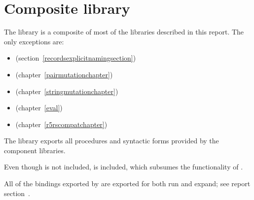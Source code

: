 \chapter{Composite library}
\label{complibchapter}

The  library is a composite of most of the libraries
described in this report.  The only exceptions are:
%
\begin{itemize}
\item {} (section~\ref{recordsexplicitnamingsection})
\item {} (chapter~\ref{pairmutationchapter})
\item {} (chapter~\ref{stringmutationchapter})
\item {} (chapter~\ref{eval})
\item {} (chapter~\ref{r5rscompatchapter})
\end{itemize}
%
The library exports all procedures and syntactic forms provided by the
component libraries.

\begin{note}
  Even though  is not
  included,  is included, which
  subsumes the functionality of .
\end{note}

All of the bindings exported by  are exported for both {\cf run}
and {\cf expand}; see report section~.

